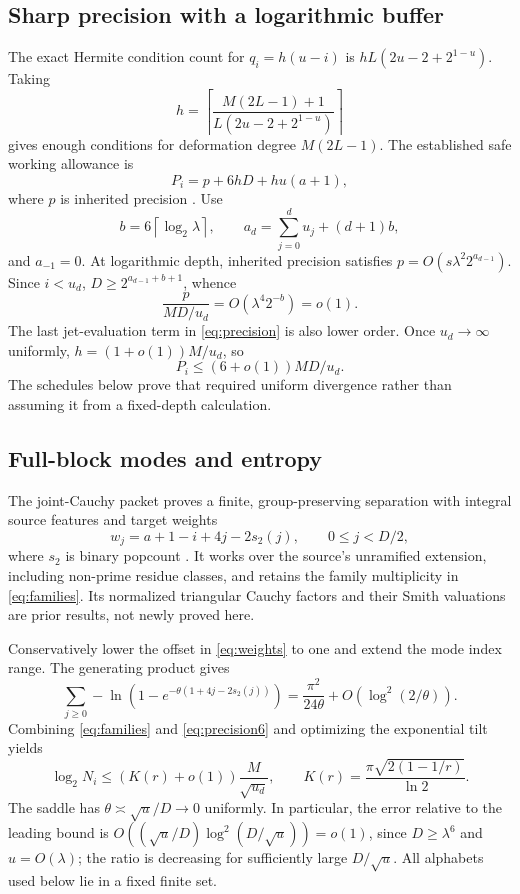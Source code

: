 \documentclass[11pt,letterpaper]{article}
\theoremstyle{remark}\newtheorem{remark}[theorem]{Remark}
\newcommand{\ceil}[1]{\left\lceil#1\right\rceil}
\begin{document}
\subsection{Sharp precision with a logarithmic buffer}

The exact Hermite condition count for $q_i=h(u-i)$ is
$hL(2u-2+2^{1-u})$. Taking
\[
 h=\ceil{\frac{M(2L-1)+1}{L(2u-2+2^{1-u})}}
\]
gives enough conditions for deformation degree $M(2L-1)$. The established
safe working allowance is
\begin{equation}\label{eq:precision}
 P_i=p+6hD+hu(a+1),
\end{equation}
where $p$ is inherited precision \cite{contraction,precision}. Use
\begin{equation}\label{eq:buffer}
 b=6\ceil{\log_2\lambda},\qquad
 a_d=\sum_{j=0}^d u_j+(d+1)b,
\end{equation}
and $a_{-1}=0$. At logarithmic depth, inherited precision satisfies
$p=O(s\lambda^2 2^{a_{d-1}})$. Since $i<u_d$,
$D\ge2^{a_{d-1}+b+1}$, whence
\[
 \frac{p}{MD/u_d}=O(\lambda^4 2^{-b})=o(1).
\]
The last jet-evaluation term in \eqref{eq:precision} is also lower order.
Once $u_d\to\infty$ uniformly, $h=(1+o(1))M/u_d$, so
\begin{equation}\label{eq:precision6}
 P_i\le(6+o(1))MD/u_d.
\end{equation}
The schedules below prove that required uniform divergence rather than
assuming it from a fixed-depth calculation.

\subsection{Full-block modes and entropy}

The joint-Cauchy packet proves a finite, group-preserving separation with
integral source features and target weights
\begin{equation}\label{eq:weights}
 w_j=a+1-i+4j-2s_2(j),\qquad 0\le j<D/2,
\end{equation}
where $s_2$ is binary popcount \cite{joint}. It works over the source's
unramified extension, including non-prime residue classes, and retains
the family multiplicity in \eqref{eq:families}. Its normalized triangular
Cauchy factors and their Smith valuations are prior results, not newly
proved here.

Conservatively lower the offset in \eqref{eq:weights} to one and extend
the mode index range. The generating product gives
\[
 \sum_{j\ge0}-\ln(1-e^{-\theta(1+4j-2s_2(j))})
 =\frac{\pi^2}{24\theta}+O(\log^2(2/\theta)).
\]
Combining \eqref{eq:families} and \eqref{eq:precision6} and optimizing
the exponential tilt yields
\begin{equation}\label{eq:local-ps}
 \log_2 N_i\le(K(r)+o(1))\frac{M}{\sqrt{u_d}},\qquad
 K(r)=\frac{\pi\sqrt{2(1-1/r)}}{\ln2}.
\end{equation}
The saddle has $\theta\asymp\sqrt u/D\to0$ uniformly. In particular,
the error relative to the leading bound is
$O((\sqrt u/D)\log^2(D/\sqrt u))=o(1)$, since $D\ge\lambda^6$ and
$u=O(\lambda)$; the ratio is decreasing for sufficiently large
$D/\sqrt u$. All alphabets used below lie in a fixed finite set.
\end{document}
